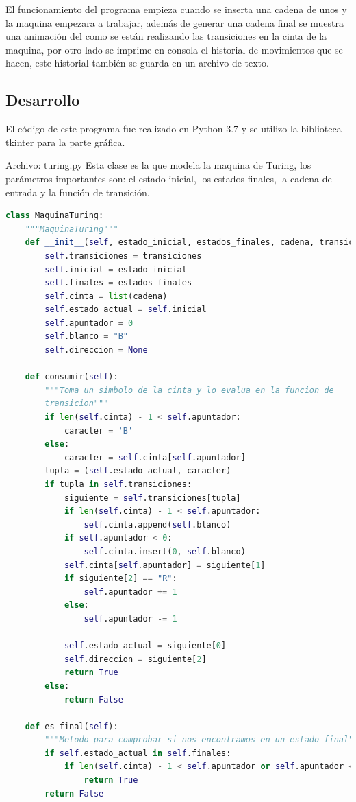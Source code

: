 El funcionamiento del programa empieza cuando se inserta una cadena de unos y la maquina empezara a trabajar, además de generar una cadena final se muestra una animación del como se están realizando las transiciones en la cinta de la maquina, por otro lado se imprime en consola el historial de movimientos que se hacen, este historial también se guarda en un archivo de texto.

\subsection{Desarrollo}
El código de este programa fue realizado en Python 3.7 y se utilizo la biblioteca tkinter para la parte gráfica.

Archivo: turing.py
Esta clase es la que modela la maquina de Turing, los parámetros importantes son: el estado inicial, los estados finales, la cadena de entrada y la función de transición.
\begin{lstlisting}[language=Python]
class MaquinaTuring:
    """MaquinaTuring"""
    def __init__(self, estado_inicial, estados_finales, cadena, transiciones):
        self.transiciones = transiciones
        self.inicial = estado_inicial
        self.finales = estados_finales
        self.cinta = list(cadena)
        self.estado_actual = self.inicial
        self.apuntador = 0
        self.blanco = "B"
        self.direccion = None

    def consumir(self):
        """Toma un simbolo de la cinta y lo evalua en la funcion de
        transicion"""
        if len(self.cinta) - 1 < self.apuntador:
            caracter = 'B'
        else:
            caracter = self.cinta[self.apuntador]
        tupla = (self.estado_actual, caracter)
        if tupla in self.transiciones:
            siguiente = self.transiciones[tupla]
            if len(self.cinta) - 1 < self.apuntador:
                self.cinta.append(self.blanco)
            if self.apuntador < 0:
                self.cinta.insert(0, self.blanco)
            self.cinta[self.apuntador] = siguiente[1]
            if siguiente[2] == "R":
                self.apuntador += 1
            else:
                self.apuntador -= 1

            self.estado_actual = siguiente[0]
            self.direccion = siguiente[2]
            return True
        else:
            return False

    def es_final(self):
        """Metodo para comprobar si nos encontramos en un estado final"""
        if self.estado_actual in self.finales:
            if len(self.cinta) - 1 < self.apuntador or self.apuntador < 0:
                return True
        return False
\end{lstlisting}

